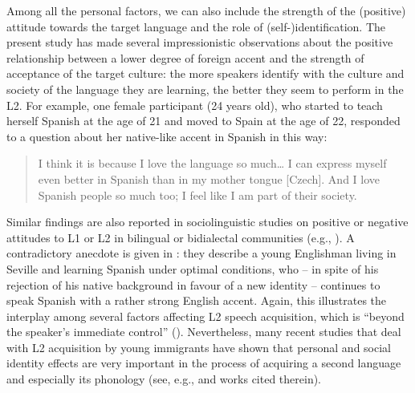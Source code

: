 Among all the personal factors, we can also include the strength of the (positive) attitude towards the target language and the role of (self-)identification. The present study has made several impressionistic observations about the positive relationship between a lower degree of foreign accent and the strength of acceptance of the target culture: the more speakers identify with the culture and society of the language they are learning, the better they seem to perform in the L2. For example, one female participant (24 years old), who started to teach herself Spanish at the age of 21 and moved to Spain at the age of 22, responded to a question about her native-like accent in Spanish in this way:

\begin{quote}
I think it is because I love the language so much… I can express myself even better in Spanish than in my mother tongue [Czech]. And I love Spanish people so much too; I feel like I am part of their society.
\end{quote}

Similar findings are also reported in sociolinguistic studies on positive or negative attitudes to L1 or L2 in bilingual or bidialectal communities (e.g., \citealt{Labov1972, KleeLynch2009, Silva-CorvalánEnrique-Arias2017}). A contradictory anecdote is given in \citet{DerwingMunro2015}: they describe a young Englishman living in Seville and learning Spanish under optimal conditions, who -- in spite of his rejection of his native background in favour of a new identity -- continues to speak Spanish with a rather strong English accent. Again, this illustrates the interplay among several factors affecting L2 speech acquisition, which is “beyond the speaker’s immediate control” (\citealt[29]{DerwingMunro2015}). Nevertheless, many recent studies that deal with L2 acquisition by young immigrants have shown that personal and social identity effects are very important in the process of acquiring a second language and especially its phonology (see, e.g., \citealt{Moyer2004, NortonMcKinney2011, LevisMoyer2014, Cutler2014} and works cited therein).


